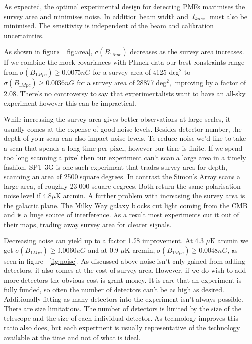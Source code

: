 As expected, the optimal experimental design for detecting PMFs maximises the survey area and minimises noise. In addition beam width and $\ell_{knee}$ must also be minimised. The sensitivity is independent of the beam and calibration uncertainties.

As shown in figure ~\ref{fig:area}, $\sigma(B_{1Mpc})$ decreases as the survey area increases. If we combine the mock covariances with Planck data our best constraints range from $\sigma(B_{1Mpc}) \geq 0.0075nG$ for a survey area of 4125 deg$^2$ to $\sigma(B_{1Mpc}) \geq 0.0036nG$ for a survey area of 28877 deg$^2$, improving by a factor of 2.08. There's no controversy to say that experimentalists want to have an all-sky experiment however this can be impractical. 

While increasing the survey area gives better observations at large scales, it usually comes at the expense of good noise levels. Besides detector number, the depth of your scan can also impact noise levels. To reduce noise we'd like to take a scan that spends a long time per pixel, however our time is finite. If we spend too long scanning a pixel then our experiment can't scan a large area in a timely fashion. SPT-3G is one such experiment that trades survey area for depth, scanning an area of 2500 square degrees. In contrast the Simon's Array scans a large area, of roughly 23 000 square degrees. Both return the same polarisation noise level if 4.8$\mu$K arcmin. A further problem with increasing the survey area is the galactic plane. The Milky Way galaxy blocks out light coming from the CMB and is a huge source of interference. As a result most experiments cut it out of their maps, trading away survey area for clearer signals.

Decreasing noise can yield up to a factor 1.28 improvement. At 4.3 $\mu$K arcmin we get $\sigma(B_{1Mpc}) \geq 0.0060nG$ and at 0.9 $\mu$K arcmin, $\sigma(B_{1Mpc}) \geq 0.0048nG$, as seen in figure ~\ref{fig:noise}. As discussed above noise isn't only gained from adding detectors, it also comes at the cost of survey area. However, if we do wish to add more detectors the obvious cost is grant money. It is rare that an experiment is fully funded, so often the number of detectors can't be as high as desired. Additionally fitting as many detectors into the experiment isn't always possible. There are size limitations. The number of detectors is limited by the size of the telescope and the size of each individual detector. As technology improves this ratio also does, but each experiment is usually representative of the technology available at the time and not of what is ideal.

